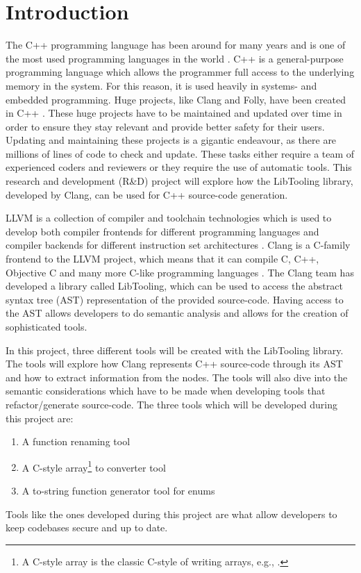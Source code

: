 \chapter{Introduction}

The C++ programming language has been around for many years and is one of the most used programming languages in the world \cite{nexttechnologyprofessionalsMostPopularProgramming2022}.
C++ is a general-purpose programming language which allows the programmer full access to the underlying memory in the system. 
For this reason, it is used heavily in systems- and embedded programming. \cite{adminWhereUsedIndustry2021}
Huge projects, like Clang and Folly, have been created in C++ \cite{clangClangLanguageFamily, facebookFollyFacebookOpensource2023}.
These huge projects have to be maintained and updated over time in order to ensure they stay relevant and provide better safety for their users. 
Updating and maintaining these projects is a gigantic endeavour, as there are millions of lines of code to check and update.
These tasks either require a team of experienced coders and reviewers or they require the use of automatic tools.
This research and development (R\&D) project will explore how the LibTooling library, developed by Clang, can be used for C++ source-code generation.

LLVM is a collection of compiler and toolchain technologies which is used to develop both compiler frontends for different programming languages and compiler backends for different instruction set architectures \cite{llvmLLVMCompilerInfrastructure}.
Clang is a C-family frontend to the LLVM project, which means that it can compile C, C++, Objective C and many more C-like programming languages \cite{clangClangLanguageFamily}.
The Clang team has developed a library called LibTooling, which can be used to access the abstract syntax tree (AST) representation of the provided source-code. 
Having access to the AST allows developers to do semantic analysis and allows for the creation of sophisticated tools.

In this project, three different tools will be created with the LibTooling library. The tools will explore how Clang represents C++ source-code through its AST and how to extract information from the nodes. The tools will also dive into the semantic considerations which have to be made when developing tools that refactor/generate source-code. The three tools which will be developed during this project are:

\begin{enumerate}
    \item A function renaming tool
    \item A C-style array\footnote{A C-style array is the classic C-style of writing arrays, e.g., .} to  converter tool
    \item A to-string function generator tool for enums
\end{enumerate}

Tools like the ones developed during this project are what allow developers to keep codebases secure and up to date.